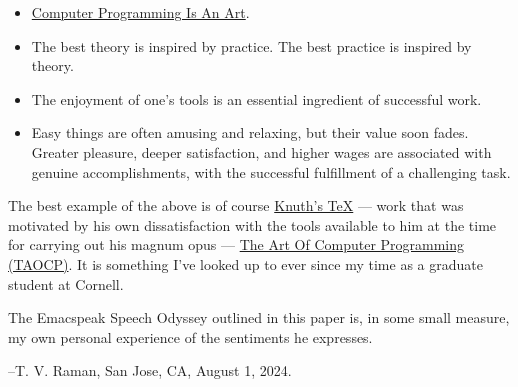 \documentclass[11pt]{article}
\begin{document}
\begin{itemize}
\item \href{https://www.azquotes.com/author/8177-Donald\_Knuth}{Computer Programming Is An Art}.
\item The best theory is inspired by practice. The best practice is
inspired by theory.
\item The enjoyment of one's tools is an essential ingredient of
successful work.
\item Easy things are often amusing and relaxing, but their value soon
fades. Greater pleasure, deeper satisfaction, and higher wages are
associated with genuine accomplishments, with the successful
fulfillment of a challenging task.
\end{itemize}

The best example of the above is of course \href{https://en.wikipedia.org/wiki/TeX}{Knuth's \TeX{}} --- work that
    was motivated  by his own dissatisfaction with the tools available
    to him at the time for carrying out his magnum opus --- \href{https://www-cs-faculty.stanford.edu/\~knuth/taocp.html}{The Art
    Of Computer Programming (TAOCP)}.  It is something I've looked up
    to ever since my time as a graduate student at Cornell.


The  Emacspeak Speech Odyssey outlined in this paper is, in some
small measure, my own personal
experience of the sentiments he expresses.

--T. V. Raman,  San Jose, CA, August 1, 2024.
\end{document}
